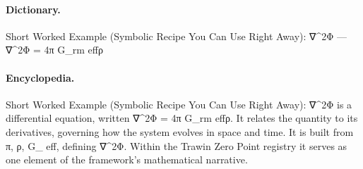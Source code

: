 \paragraph{Dictionary.}
Short Worked Example (Symbolic Recipe You Can Use Right Away): ∇\textasciicircum{}2Φ — ∇\textasciicircum{}2Φ = 4π G\_rm effρ

\paragraph{Encyclopedia.}
Short Worked Example (Symbolic Recipe You Can Use Right Away): ∇\textasciicircum{}2Φ is a differential equation, written ∇\textasciicircum{}2Φ = 4π G\_rm effρ. It relates the quantity to its derivatives, governing how the system evolves in space and time. It is built from π, ρ, G\_ eff, defining ∇\textasciicircum{}2Φ. Within the Trawin Zero Point registry it serves as one element of the framework's mathematical narrative.
